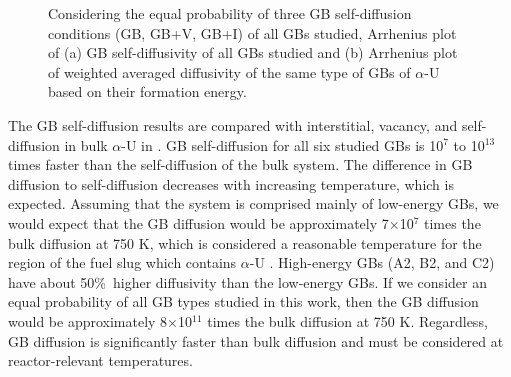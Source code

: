 \documentclass[review]{elsarticle}
\begin{document}
\begin{figure}[h!]
\centering
{}
\caption{Considering the equal probability of three GB self-diffusion conditions (GB, GB+V, GB+I) of all GBs studied, Arrhenius plot of (a) GB self-diffusivity of all GBs studied and (b) Arrhenius plot of weighted averaged diffusivity of the same type of GBs of $\alpha$-U based on their formation energy.}
\label{fig:final}
\end{figure}

The GB self-diffusion results are compared with interstitial, vacancy, and self-diffusion in bulk $\alpha$-U in  \cite{WANG2023154289}. GB self-diffusion for all six studied GBs is 10${^7}$ to 10$^{13}$ times faster than the self-diffusion of the bulk system. The difference in GB diffusion to self-diffusion decreases with increasing temperature, which is expected. Assuming that the system is comprised mainly of low-energy GBs, we would expect that the GB diffusion would be approximately 7$\times$10$^{7}$ times the bulk diffusion at 750 K, which is considered a reasonable temperature for the region of the fuel slug which contains $\alpha$-U \cite{KIM200617}. High-energy GBs (A2, B2, and C2) have about 50\%\ higher diffusivity than the low-energy GBs. If we consider an equal probability of all GB types studied in this work, then the GB diffusion would be approximately 8$\times$10$^{11}$ times the bulk diffusion at 750 K. Regardless, GB diffusion is significantly faster than bulk diffusion and must be considered at reactor-relevant temperatures. 
\end{document}
